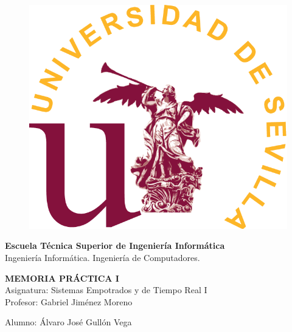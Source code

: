 \documentclass[11pt,a4paper]{article}
\begin{document}
	\begin{titlepage}
		\begin{center}
			\begin{figure}
				\centering
				\includegraphics[scale=0.2]{US-marca-principal.png}
			\end{figure}
			{\large \textbf{Escuela Técnica Superior de Ingeniería Informática}}
			\vspace{2mm}\\
			{Ingeniería Informática. Ingeniería de Computadores.}
			\vspace{60mm}\\
			\begin{center}
				{\huge \textbf{MEMORIA PRÁCTICA I}}\\[2mm]
				{Asignatura: Sistemas Empotrados y de Tiempo Real I}\\
				{Profesor: Gabriel Jiménez Moreno}
			\end{center}
			\vfill
			{Alumno: Álvaro José Gullón Vega}
		\end{center}
	\end{titlepage}
	\pagebreak
	\tableofcontents
	\pagebreak
	
\end{document}
